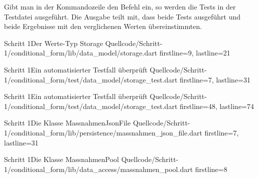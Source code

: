 Gibt man in der Kommandozeile den Befehl    ein, so werden die Tests in der Testdatei ausgeführt. Die Ausgabe  teilt mit, dass beide Tests ausgeführt und beide Ergebnisse mit den verglichenen Werten übereinstimmten.









\begin{alexlisting}{Schritt 1}{Der Werte-Typ Storage}
  {Quellcode/Schritt-1/conditional_form/lib/data_model/storage.dart}
  {firstline=9, lastline=21}
  \label{lst:Schritt1WerteTypStorage}
\end{alexlisting}




\begin{alexlisting}{Schritt 1}{Ein automatisierter Testfall überprüft}
  {Quellcode/Schritt-1/conditional_form/test/data_model/storage_test.dart}
  {firstline=7, lastline=31}
  \label{lst:Schritt1MaßnahmenSerialisierenOhneFehlerUnitTest}
\end{alexlisting}



\begin{alexlisting}{Schritt 1}{Ein automatisierter Testfall überprüft}
  {Quellcode/Schritt-1/conditional_form/test/data_model/storage_test.dart}
  {firstline=48, lastline=74}
  \label{lst:Schritt1MaßnahmenDeserialisierenOhneFehlerUnitTest}
\end{alexlisting}





\begin{alexlisting}{Schritt 1}{Die Klasse MassnahmenJsonFile}
  {Quellcode/Schritt-1/conditional_form/lib/persistence/massnahmen_json_file.dart}
  {firstline=7, lastline=31}
  \label{lst:Schritt1KlasseMassnahmenJsonFile}
\end{alexlisting}

\begin{alexlisting}{Schritt 1}{Die Klasse MassnahmenPool}
  {Quellcode/Schritt-1/conditional_form/lib/data_access/massnahmen_pool.dart}
  {firstline=8}
  \label{lst:Schritt1KlasseMassnahmenPool}
\end{alexlisting}















